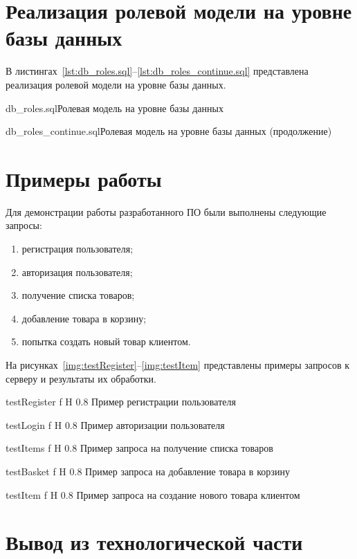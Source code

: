 \documentclass{bmstu}
\begin{document}
\section{Реализация ролевой модели на уровне базы данных}

В листингах~\ref{lst:db_roles.sql}--\ref{lst:db_roles_continue.sql} представлена реализация ролевой модели на уровне базы данных.

{db_roles.sql}{Ролевая модель на уровне базы данных}

\pagebreak

{db_roles_continue.sql}{Ролевая модель на уровне базы данных (продолжение)}


\section{Примеры работы}

Для демонстрации работы разработанного ПО были выполнены следующие запросы:

\begin{enumerate}
	\item регистрация пользователя;
	\item авторизация пользователя;
	\item получение списка товаров;
	\item добавление товара в корзину;
	\item попытка создать новый товар клиентом.
\end{enumerate}

На рисунках~\ref{img:testRegister}--\ref{img:testItem} представлены примеры запросов к серверу и результаты их обработки.

{testRegister}
{f}
{H}
{0.8\textwidth}
{Пример регистрации пользователя}

{testLogin}
{f}
{H}
{0.8\textwidth}
{Пример авторизации пользователя}

{testItems}
{f}
{H}
{0.8\textwidth}
{Пример запроса на получение списка товаров}

{testBasket}
{f}
{H}
{0.8\textwidth}
{Пример запроса на добавление товара в корзину}

{testItem}
{f}
{H}
{0.8\textwidth}
{Пример запроса на создание нового товара клиентом}


\section*{Вывод из технологической части}
\end{document}
